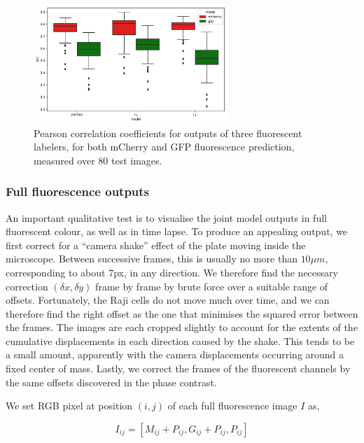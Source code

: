 \begin{figure}[h!]
\centering
\includegraphics[width=0.65\textwidth]{img/pix2pix_pcc.pdf}
\caption{Pearson correlation coefficients for outputs of three fluorescent labelers, for both mCherry and GFP fluorescence prediction, measured over $80$ test images.}
\label{fig:pix2pix_pcc}
\end{figure}

\subsubsection{Full fluorescence outputs}

An important qualitative test is to visualise the joint model outputs in full fluorescent colour, as well as in time lapse. To produce an appealing output, we first correct for a ``camera shake'' effect of the plate moving inside the microscope. Between successive frames, this is usually no more than $10 \mu m$, corresponding to about $7$px, in any direction. We therefore find the necessary correction $(\delta x, \delta y)$ frame by frame by brute force over a suitable range of offsets. Fortunately, the Raji cells do not move much over time, and we can therefore find the right offset as the one that minimises the squared error between the frames. The images are each cropped slightly to account for the extents of the cumulative displacements in each direction caused by the shake. This tends to be a small amount, apparently with the camera displacements occurring around a fixed center of mass. Lastly, we correct the frames of the fluorescent channels by the same offsets discovered in the phase contrast.

We set RGB pixel at position $(i, j)$ of each full fluorescence image $I$ as,

\begin{equation}
I_{ij} = [M_{ij} + P_{ij}, G_{ij} + P_{ij}, P_{ij}]
\end{equation}

